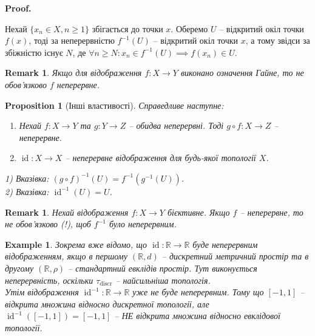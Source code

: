 \documentclass[a4paper, 10pt]{article}
\makeatletter
\theoremstyle{theoremdd}
\newtheorem{example}[theorem]{Example}
\newtheorem{proposition}[theorem]{Proposition}
\newtheorem{remark}[theorem]{Remark}
\DeclareMathOperator{\id}{id}
\renewenvironment{proof}[1][Proof.\\]{\par
\pushQED{\hfill \qed}%
\normalfont \topsep6\p@\@plus6\p@\relax
\trivlist
\item\relax
{\bfseries
#1\@addpunct{.}}\hspace\labelsep\ignorespaces
}{%
\popQED\endtrivlist\@endpefalse
}
\makeatother
\begin{document}
\begin{proof}
Нехай $\{x_n \in X, n \geq 1\}$ збігається до точки $x$. Оберемо $U$ -- відкритий окіл точки $f(x)$, тоді за неперервністю $f^{-1}(U)$ -- відкритий окіл точки $x$, а тому звідси за збіжністю існує $N$, де $\forall n \geq N: x_n \in f^{-1}(U) \implies f(x_n) \in U$.
\end{proof}

\begin{remark}
Якщо для відображення $f \colon X \to Y$ виконано означення Гайне, то не обов'язково $f$ неперервне.
\end{remark}

\begin{proposition}[Інші властивості]
Справедливе наступне:
\begin{enumerate}[nosep,wide=0pt,label={\arabic*)}]
\item Нехай $f \colon X \to Y$ та $g \colon Y \to Z$ -- обидва неперервні. Тоді $g \circ f \colon X \to Z$ -- неперервне.
\item $\id \colon X \to X$ -- неперервне відображення для будь-якої топології $X$.\\
\end{enumerate}
1) \textit{Вказівка: $(g \circ f)^{-1}(U) = f^{-1}(g^{-1}(U))$.}\\
2) \textit{Вказівка: $\id^{-1}(U) = U$.}
\end{proposition}

\begin{remark}
Нехай відображення $f \colon X \to Y$ бієктивне. Якщо $f$ -- неперервне, то не обов'язково (!), щоб $f^{-1}$ було неперервним.
\end{remark}

\begin{example}
Зокрема вже відомо, що $\id \colon \mathbb{R} \to \mathbb{R}$ буде неперервним відображенням, якщо в першому $(\mathbb{R},d)$ -- дискретний метричний простір та в другому $(\mathbb{R},\rho)$ -- стандартний евклідів простір. Тут виконується неперервність, оскільки $\tau_{\text{discr}}$ -- найсильніша топологія.\\
Утім відображення $\id^{-1} \colon \mathbb{R} \to \mathbb{R}$ уже не буде неперервним. Тому що $[-1,1]$ -- відкрита множина відносно дискретної топології, але $\id^{-1}([-1,1]) = [-1,1]$ -- НЕ відкрита множина відносно евклідової топології.
\end{example}
\end{document}
